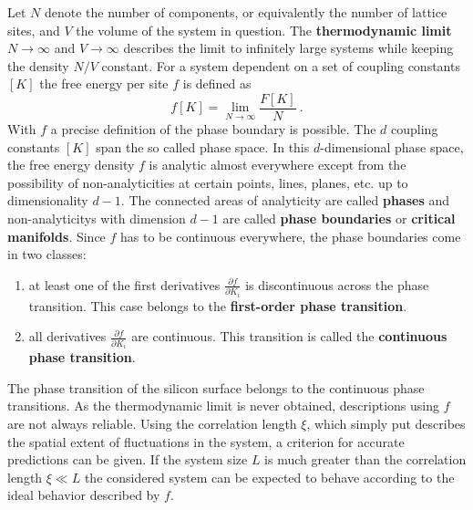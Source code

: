 	Let $N$ denote the number of components, or equivalently the number of lattice sites, and $V$ the volume of the system in question. The \textbf{thermodynamic limit} $N \rightarrow \infty$ and $V \rightarrow \infty$ describes the limit to infinitely large systems while keeping the density $N/V$ constant. For a system dependent on a set of coupling constants $[K]$ the free energy per site $f$ is defined as
	\begin{equation}
		f[K] =	\lim\limits_{N \rightarrow \infty} \frac{F[K]}{N} ~.
	\end{equation}
	With $f$ a precise definition of the phase boundary is possible. The $d$ coupling constants $[K]$ span the so called phase space. In this $d$-dimensional phase space, the free energy density $f$ is analytic almost everywhere except from the possibility of non-analyticities at certain points, lines, planes, etc. up to dimensionality $d-1$. The connected areas of analyticity are called \textbf{phases} and non-analyticitys with dimension $d-1$ are called \textbf{phase boundaries} or \textbf{critical manifolds}. Since $f$ has to be continuous everywhere, the phase boundaries come in two classes:
	\begin{enumerate}
		\item at least one of the first derivatives $\frac{\partial f}{\partial K_i}$ is discontinuous across the phase transition. This case belongs to the \textbf{first-order phase transition}.
		\item all derivatives $\frac{\partial f}{\partial K_i}$ are continuous. This transition is called the \textbf{continuous phase transition}.
	\end{enumerate}
	The phase transition of the silicon surface belongs to the continuous phase transitions. As the thermodynamic limit is never obtained, descriptions using $f$ are not always reliable. Using the correlation length $\xi$, which simply put describes the spatial extent of fluctuations in the system, a criterion for accurate predictions can be given. If the system size $L$ is much greater than the correlation length $\xi \ll L$ the considered system can be expected to behave according to the ideal behavior described by $f$. \\

